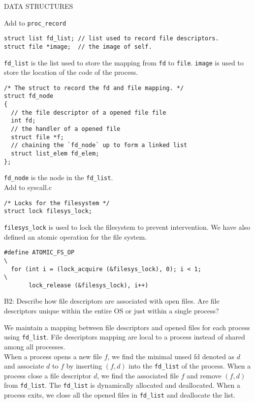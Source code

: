\begin{aspect}{DATA STRUCTURES}
	\begin{tcolorbox}[title=for file system access]
		Add to \lstinline{proc_record}
		\begin{lstlisting}
struct list fd_list; // list used to record file descriptors.
struct file *image;  // the image of self.
\end{lstlisting}
		\lstinline{fd_list} is the list used to store the mapping from \lstinline{fd} to \lstinline{file}. \lstinline{image} is used to store the location of the code of the process.
		\begin{lstlisting}
/* The struct to record the fd and file mapping. */
struct fd_node
{
  // the file descriptor of a opened file file
  int fd;         
  // the handler of a opened file
  struct file *f;
  // chaining the `fd_node` up to form a linked list
  struct list_elem fd_elem;
};
	\end{lstlisting}
		\lstinline{fd_node} is the node in the \lstinline{fd_list}.\\
		Add to syscall.c
		\begin{lstlisting}
/* Locks for the filesystem */
struct lock filesys_lock;
\end{lstlisting}
		\lstinline{filesys_lock} is used to lock the filesystem to prevent intervention. We have also defined an atomic operation for the file system.
		\begin{lstlisting}
#define ATOMIC_FS_OP                                                          \
  for (int i = (lock_acquire (&filesys_lock), 0); i < 1;                      \
       lock_release (&filesys_lock), i++)
\end{lstlisting}

	\end{tcolorbox}

	\begin{qc}
		B2: Describe how file descriptors are associated with open files.
		Are file descriptors unique within the entire OS or just within a single process?
	\end{qc}
	We maintain a mapping between file descriptors and opened files for each process using \lstinline{fd_list}. File descriptors mapping are local to a process instead of shared among all processes.\\
	When a process opens a new file $f$, we find the minimal unsed fd denoted as $d$ and associate $d$ to $f$ by inserting $(f,d)$ into the \lstinline{fd_list} of the process.
	When a process close a file descriptor $d$, we find the associated file $f$ and remove $(f,d)$ from \lstinline{fd_list}.
	The \lstinline{fd_list} is dynamically allocated and deallocated.
	When a process exits, we close all the opened files in \lstinline{fd_list} and deallocate the list.\\
\end{aspect}

